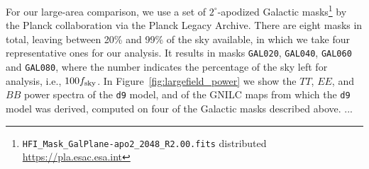 \documentclass[twocolumn]{aastex631}
\newcommand{\dnine}{{\tt d9}}
\begin{document}
For our large-area comparison, we use a set of $2^\circ$-apodized Galactic masks\footnote{\texttt{HFI\_Mask\_GalPlane-apo2\_2048\_R2.00.fits} distributed \url{https://pla.esac.esa.int}} by the Planck collaboration via the Planck Legacy Archive. There are eight masks in total, leaving between 20\% and 99\% of the sky available, in which we take four representative ones for our analysis. It results in masks \texttt{GAL020}, \texttt{GAL040}, \texttt{GAL060} and \texttt{GAL080}, where the number indicates the percentage of the sky left for analysis, i.e., $100 f_{\rm sky}$. In Figure~\ref{fig:largefield_power} we show the $TT$, $EE$, and $BB$ power spectra of the \dnine{} model, and of the GNILC maps from which the \dnine{} model was derived, computed on four of the Galactic masks described above. ... 


\end{document}
